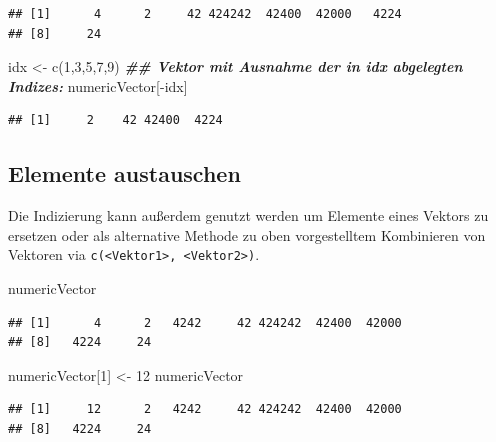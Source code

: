 \documentclass[
]{book}
\newenvironment{Shaded}{\begin{snugshade}}{\end{snugshade}}
\newcommand{\DecValTok}[1]{\textcolor[rgb]{0.00,0.00,0.81}{#1}}
\newcommand{\DocumentationTok}[1]{\textcolor[rgb]{0.56,0.35,0.01}{\textbf{\textit{#1}}}}
\newcommand{\FunctionTok}[1]{\textcolor[rgb]{0.00,0.00,0.00}{#1}}
\newcommand{\NormalTok}[1]{#1}
\newcommand{\OtherTok}[1]{\textcolor[rgb]{0.56,0.35,0.01}{#1}}
\newcommand{\SpecialCharTok}[1]{\textcolor[rgb]{0.00,0.00,0.00}{#1}}
\begin{document}
\begin{verbatim}
## [1]      4      2     42 424242  42400  42000   4224
## [8]     24
\end{verbatim}

\begin{Shaded}
\begin{Highlighting}[]
\NormalTok{idx }\OtherTok{\textless{}{-}} \FunctionTok{c}\NormalTok{(}\DecValTok{1}\NormalTok{,}\DecValTok{3}\NormalTok{,}\DecValTok{5}\NormalTok{,}\DecValTok{7}\NormalTok{,}\DecValTok{9}\NormalTok{)}
\DocumentationTok{\#\# Vektor mit Ausnahme der in idx abgelegten Indizes:}
\NormalTok{numericVector[}\SpecialCharTok{{-}}\NormalTok{idx]}
\end{Highlighting}
\end{Shaded}

\begin{verbatim}
## [1]     2    42 42400  4224
\end{verbatim}

\hypertarget{elemente-austauschen}{%
\subsection{Elemente austauschen}\label{elemente-austauschen}}

Die Indizierung kann außerdem genutzt werden um Elemente eines Vektors zu ersetzen oder als alternative Methode zu oben vorgestelltem Kombinieren von Vektoren via \texttt{c(\textless{}Vektor1\textgreater{},\ \textless{}Vektor2\textgreater{})}.

\begin{Shaded}
\begin{Highlighting}[]
\NormalTok{numericVector}
\end{Highlighting}
\end{Shaded}

\begin{verbatim}
## [1]      4      2   4242     42 424242  42400  42000
## [8]   4224     24
\end{verbatim}

\begin{Shaded}
\begin{Highlighting}[]
\NormalTok{numericVector[}\DecValTok{1}\NormalTok{] }\OtherTok{\textless{}{-}} \DecValTok{12}
\NormalTok{numericVector}
\end{Highlighting}
\end{Shaded}

\begin{verbatim}
## [1]     12      2   4242     42 424242  42400  42000
## [8]   4224     24
\end{verbatim}
\end{document}
